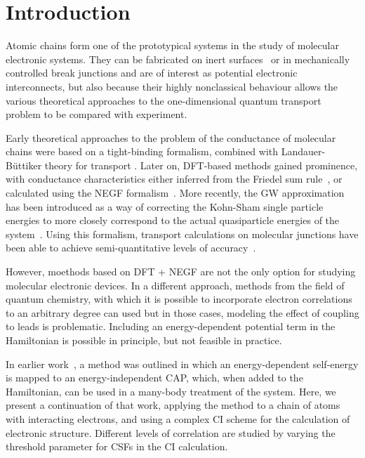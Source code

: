 \section{Introduction}

Atomic chains form one of the prototypical systems in the study of molecular
electronic systems. They can be fabricated on inert
surfaces~\cite{nilius2002science, segovia1999nature} or in mechanically
controlled break junctions \cite{vanruitenbeek1998mcbj} and are of interest as
potential electronic interconnects, but also because their highly nonclassical
behaviour allows the various theoretical approaches to the one-dimensional
quantum transport problem to be compared with experiment.

Early theoretical approaches to the problem of the conductance of molecular
chains were based on a tight-binding formalism, combined with
Landauer-B\"uttiker theory for transport
\cite{emberlykirczenow1999standingwave, emberlykirczenow2000molecularwire}.
Later on, \ac{DFT}-based methods gained prominence, with conductance
characteristics either inferred from the Friedel sum
rule~\cite{sim2001sodiumwire}, or calculated using the \ac{NEGF}
\cite{meirwingreen1992negf} formalism~\cite{leepuska2004monovalent,
thygesen2003aluminium}. More recently, the GW approximation~\cite{hedin1965gw}
has been introduced as a way of correcting the Kohn-Sham single particle
energies to more closely correspond to the actual quasiparticle energies of the
system~\cite{thygesen_rubio, thygesenrubio2010corr}. Using this formalism,
transport calculations on molecular junctions have been able to achieve
semi-quantitative levels of accuracy~\cite{strange2011benzene,
strange2011alkane}.

However, moethods based on \ac{DFT} + \ac{NEGF} are not the only option for
studying molecular electronic devices. In a different approach, methods from
the field of quantum chemistry, with which it is possible to incorporate
electron correlations to an arbitrary degree can  used \cite{vici2004} but in
those cases, modeling the effect of coupling to leads is problematic. Including
an energy-dependent potential term in the Hamiltonian is possible in principle,
but not feasible in practice.

In earlier work~\cite{henderson}, a method was outlined in which an
energy-dependent self-energy is mapped to an energy-independent
\ac{CAP}, which, when added to the Hamiltonian, can be used
in a many-body treatment of the system. Here, we present a continuation of that
work, applying the method to a chain of atoms with interacting electrons, and
using a complex \ac{CI} scheme for the calculation of electronic structure.
Different levels of correlation are studied by varying the threshold
parameter for \acp{CSF} in the \ac{CI} calculation.

